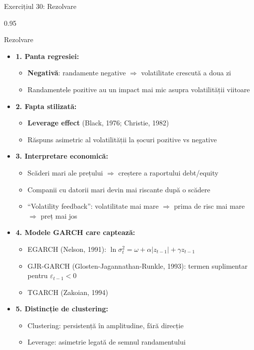\documentclass[9pt, aspectratio=169, t]{beamer}
\begin{document}
\begin{frame}[shrink=25]{Exercițiul 30: Rezolvare}
\begin{cminipage}{0.95\textwidth}
\begin{exampleblock}{Rezolvare}
\begin{itemize}\setlength{\itemsep}{0pt}
    \item \textbf{1. Panta regresiei:}
    \begin{itemize}\setlength{\itemsep}{0pt}
        \item \textbf{Negativă}: randamente negative $\Rightarrow$ volatilitate crescută a doua zi
        \item Randamentele pozitive au un impact mai mic asupra volatilității viitoare
    \end{itemize}
    \item \textbf{2. Fapta stilizată:}
    \begin{itemize}\setlength{\itemsep}{0pt}
        \item \textbf{Leverage effect} (Black, 1976; Christie, 1982)
        \item Răspuns asimetric al volatilității la șocuri pozitive vs negative
    \end{itemize}
    \item \textbf{3. Interpretare economică:}
    \begin{itemize}\setlength{\itemsep}{0pt}
        \item Scăderi mari ale prețului $\Rightarrow$ creștere a raportului debt/equity
        \item Companii cu datorii mari devin mai riscante după o scădere
        \item ``Volatility feedback'': volatilitate mai mare $\Rightarrow$ prima de risc mai mare $\Rightarrow$ preț mai jos
    \end{itemize}
    \item \textbf{4. Modele GARCH care captează:}
    \begin{itemize}\setlength{\itemsep}{0pt}
        \item EGARCH (Nelson, 1991): $\ln \sigma_t^2 = \omega + \alpha |z_{t-1}| + \gamma z_{t-1}$
        \item GJR-GARCH (Glosten-Jagannathan-Runkle, 1993): termen suplimentar pentru $\varepsilon_{t-1} < 0$
        \item TGARCH (Zakoian, 1994)
    \end{itemize}
    \item \textbf{5. Distincție de clustering:}
    \begin{itemize}\setlength{\itemsep}{0pt}
        \item Clustering: persistență în amplitudine, fără direcție
        \item Leverage: asimetrie legată de semnul randamentului
    \end{itemize}
\end{itemize}
\end{exampleblock}
\end{cminipage}
\end{frame}
\end{document}
